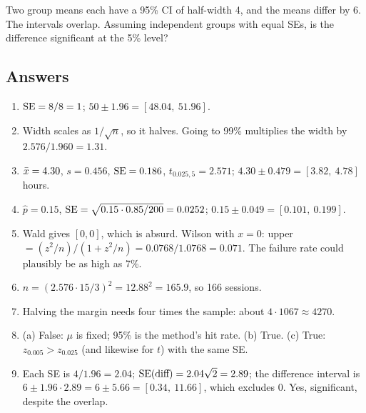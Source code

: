 \begin{exercise}
Two group means each have a 95\% CI of half-width 4, and the means differ by 6.
The intervals overlap. Assuming independent groups with equal SEs, is the
difference significant at the 5\% level?
\end{exercise}

\subsection*{Answers}

\begin{enumerate}[label=\textbf{\arabic*.}]
  \item $\operatorname{SE} = 8/8 = 1$; $50 \pm 1.96 = [48.04,\ 51.96]$.
  \item Width scales as $1/\sqrt n$, so it halves. Going to 99\% multiplies
        the width by $2.576/1.960 = 1.31$.
  \item $\bar{x} = 4.30$, $s = 0.456$, $\operatorname{SE} = 0.186$, $t_{0.025,5}=2.571$;
        $4.30 \pm 0.479 = [3.82,\ 4.78]$ hours.
  \item $\hat p = 0.15$, $\operatorname{SE} = \sqrt{0.15\cdot0.85/200} = 0.0252$;
        $0.15 \pm 0.049 = [0.101,\ 0.199]$.
  \item Wald gives $[0,0]$, which is absurd. Wilson with $x=0$:
        upper $= (z^2/n)/(1+z^2/n) = 0.0768/1.0768 = 0.071$. The failure rate
        could plausibly be as high as 7\%.
  \item $n = (2.576\cdot 15/3)^2 = 12.88^2 = 165.9$, so 166 sessions.
  \item Halving the margin needs four times the sample: about $4\cdot 1067
        \approx 4270$.
  \item (a) False: $\mu$ is fixed; 95\% is the method's hit rate.
        (b) True. (c) True: $z_{0.005} > z_{0.025}$ (and likewise for $t$) with the same SE.
  \item Each SE is $4/1.96 = 2.04$; $\operatorname{SE}(\text{diff}) = 2.04\sqrt2 = 2.89$;
        the difference interval is $6 \pm 1.96\cdot 2.89 = 6\pm 5.66 =
        [0.34,\ 11.66]$, which excludes 0. Yes, significant, despite the
        overlap.
\end{enumerate}
